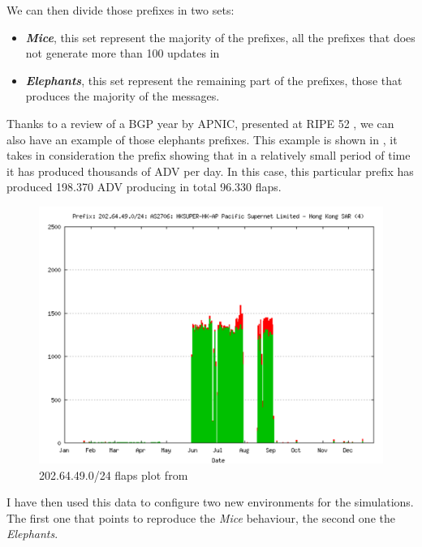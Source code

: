We can then divide those prefixes in two sets:
\begin{itemize}
	\item \textbf{\textit{Mice}}, this set represent the majority of the prefixes,
		all the prefixes that does not generate more than \num{100} updates 
		in 
	\item \textbf{\textit{Elephants}}, this set represent the remaining part
		of the prefixes, those that produces the majority of the messages.
\end{itemize}

Thanks to a review of a \ac{BGP} year by APNIC, presented at RIPE 52 \cite{huston2006bgp}, we can also have an example of those elephants prefixes.
This example is shown in , it takes in consideration the
prefix  showing that in a relatively small period of time it has
produced thousands of \ac{ADV} per day.
In this case, this particular prefix has produced \num{198,370} \ac{ADV} producing
in total \num{96,330} flaps.

\begin{figure}[h]
    \centering
    \includegraphics[scale=0.22]{images/RFD/miceVSelephants/ripePrefixFlap.png}
	\caption{202.64.49.0/24 flaps plot from \cite{huston2006bgp}}
    \label{fig:ripePrefixFlaps}
\end{figure}

I have then used this data to configure two new environments for the simulations.
The first one that points to reproduce the \textit{Mice} behaviour, the second
one the \textit{Elephants}.

